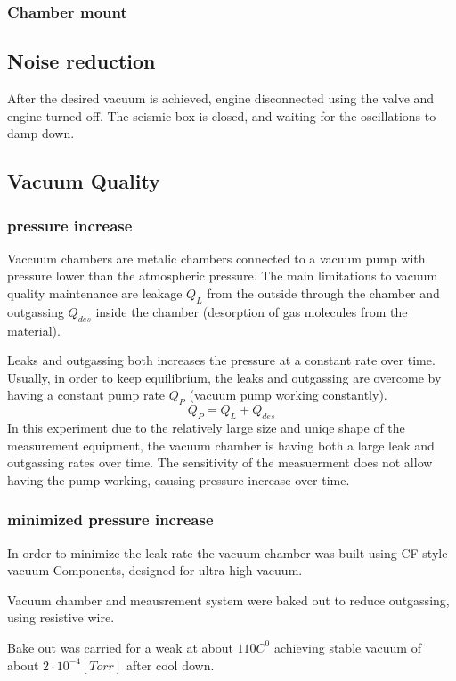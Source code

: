 \documentclass[\main/master.tex]{subfiles}
\begin{document}
\subsubsection{Chamber mount}
\subsection{Noise reduction}

\par\noindent
After the desired vacuum is achieved, engine disconnected using the valve and engine turned off. The seismic box is closed, and waiting for the oscillations to damp down.


\subsection{Vacuum Quality}
\subsubsection{pressure increase}
\par\noindent
Vaccuum chambers are metalic chambers connected to a vacuum pump with pressure lower than the atmospheric pressure. The main limitations to vacuum quality maintenance are leakage $Q_L$ from the outside through the chamber and outgassing $Q_{des}$ inside the chamber (desorption of gas molecules from the material).
\par\noindent
Leaks and outgassing both increases the pressure at a constant rate over time. Usually, in order to keep equilibrium, the leaks and outgassing are overcome by having a constant pump rate $Q_P$ (vacuum pump working constantly).   
\begin{equation}
Q_P = Q_L + Q_{des}  \label{eqn:vacuum_equilibrium}
\end{equation}
In this experiment due to the relatively large size and uniqe shape of the measurement equipment, the vacuum chamber is having both a large leak and outgassing rates over time. The sensitivity of the measuerment does not allow having the pump working, causing pressure increase over time.
\subsubsection{minimized pressure increase}
In order to minimize the leak rate the vacuum chamber was built using CF style vacuum Components, designed for ultra high vacuum.
\par\noindent
Vacuum chamber and meausrement system were baked out to reduce outgassing, using resistive wire. 
\par\noindent
Bake out was carried for a weak at about $110 C^0$ achieving stable vacuum of about $2\cdot 10^{−4} [Torr]$ after cool down.
\end{document}
